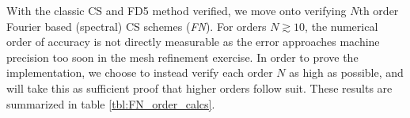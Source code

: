 \documentclass[11pt,titlepage]{report}
\begin{document}
\begin{table}
{{\begin{minipage}{0.65\hsize}
\captionsetup{width=0.75\hsize}  
 \label{fig:ClassicCS_GB3}
\end{minipage}
}}
\end{table}




With the classic CS and FD5 method verified, we move onto verifying $N$th order Fourier based (spectral) CS schemes (\emph{FN}). For orders $N \gtrsim 10$, the numerical order of accuracy is not directly measurable as the error approaches machine precision too soon in the mesh refinement exercise. In order to prove the implementation, we choose to instead verify each order $N$ as high as possible, and will take this as sufficient proof that higher orders follow suit. These results are summarized in table \ref{tbl:FN_order_calcs}.
\end{document}
